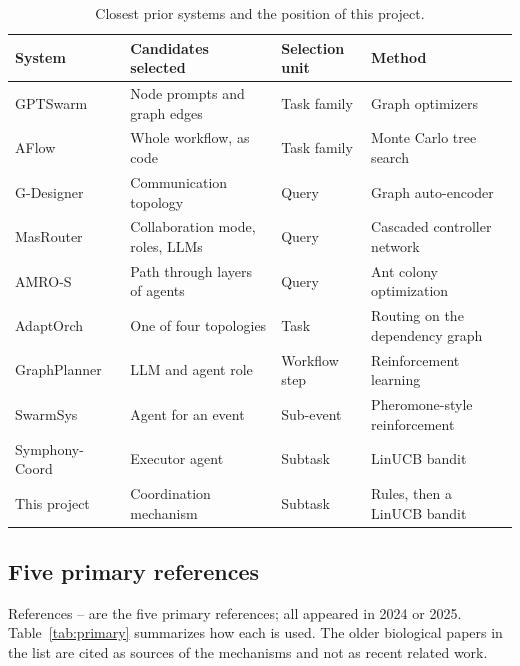 \documentclass[11pt,a4paper]{article}
\newcommand{\head}[1]{\textbf{#1}}
\begin{document}
\begin{table}[h]
\centering\small
\caption{Closest prior systems and the position of this project.}
\label{tab:related}
\begin{tabularx}{\textwidth}{@{}P{3.5cm}LP{3.0cm}P{4.3cm}@{}}
\toprule
\head{System} & \head{Candidates selected} & \head{Selection unit} & \head{Method} \\
\midrule
GPTSwarm~\cite{zhuge2024gptswarm} & Node prompts and graph edges & Task family & Graph optimizers \\
AFlow~\cite{zhang2025aflow} & Whole workflow, as code & Task family & Monte Carlo tree search \\
G-Designer~\cite{zhang2025gdesigner} & Communication topology & Query & Graph auto-encoder \\
MasRouter~\cite{yue2025masrouter} & Collaboration mode, roles, LLMs & Query & Cascaded controller network \\
AMRO-S~\cite{wang2026amros} & Path through layers of agents & Query & Ant colony optimization \\
AdaptOrch~\cite{yu2026adaptorch} & One of four topologies & Task & Routing on the dependency graph \\
GraphPlanner~\cite{feng2026graphplanner} & LLM and agent role & Workflow step & Reinforcement learning \\
SwarmSys~\cite{li2025swarmsys} & Agent for an event & Sub-event & Pheromone-style reinforcement \\
Symphony-Coord~\cite{guan2026symphony} & Executor agent & Subtask & LinUCB bandit \\
\midrule
This project & Coordination mechanism & Subtask & Rules, then a LinUCB bandit \\
\bottomrule
\end{tabularx}
\end{table}

\subsection{Five primary references}

References \cite{yue2025masrouter}--\cite{wu2025ecllm} are the five primary references; all appeared in
2024 or 2025. Table~\ref{tab:primary} summarizes how each is used. The older biological papers in the list
are cited as sources of the mechanisms and not as recent related work.
\end{document}
